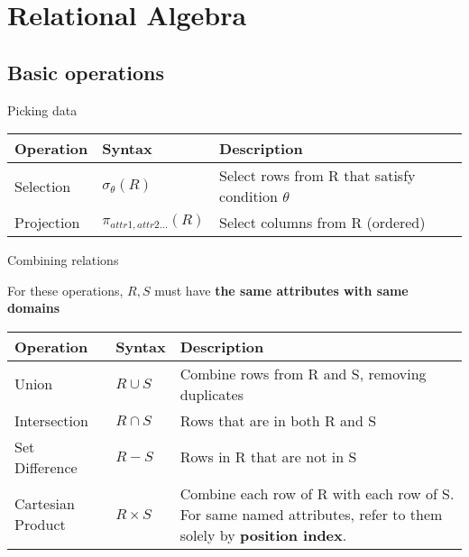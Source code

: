 \section{Relational Algebra}

\subsection{Basic operations}

\begin{theorem}
    {Picking data}
    \begin{tabular}{l|l|l}
        Operation  & Syntax                    & Description                                        \\
        \hline
        Selection  & $\sigma_{\theta}(R)$      & Select rows from R that satisfy condition $\theta$ \\
        Projection & $\pi_{attr1,attr2...}(R)$ & Select columns from R (ordered)                    \\
    \end{tabular}
\end{theorem}

\begin{theorem}
    {Combining relations}

    For these operations, $R,S$ must have \textbf{the same attributes with same domains}

    \begin{tabular}{l|l|p{10cm}}
        Operation         & Syntax       & Description                                                                                                           \\
        \hline
        Union             & $R \cup S$   & Combine rows from R and S, removing duplicates                                                                        \\
        Intersection      & $R \cap S$   & Rows that are in both R and S                                                                                         \\
        Set Difference    & $R - S$      & Rows in R that are not in S                                                                                           \\
        Cartesian Product & $R \times S$ & Combine each row of R with each row of S. For same named attributes, refer to them solely by \textbf{position index}.
    \end{tabular}
\end{theorem}

